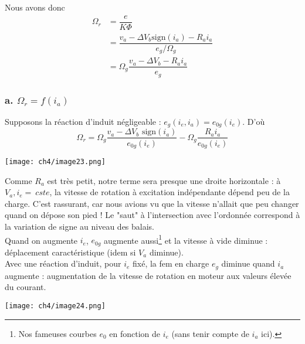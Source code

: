 	Nous avons donc
	\begin{equation}
	\begin{array}{ll}
	\Omega_r &= \dfrac{e}{K\Phi}\\
	&= \dfrac{v_a -\Delta V_b\text{sign}(i_a) - R_ai_a}{e_g/\Omega_g}\\
	&= \Omega_g\dfrac{v_a -\Delta V_b - R_ai_a}{e_g}	
	\end{array}
	\end{equation}
	
		\subsubsection{a. $\Omega_r = f(i_a)$}
		Supposons la réaction d'induit négligeable : $e_g(i_e,i_a) = e_{0g}(i_e)$. D'où
		\begin{equation}
		\Omega_r = \Omega_g \dfrac{v_a-\Delta V_b\text{ sign}(i_a)}{e_{0g}(i_e)}- 
		\Omega_g \dfrac{R_ai_a}{e_{0g}(i_e)}
		\end{equation}

\begin{center}
	\texttt{[image: ch4/image23.png]}
\end{center}
		Comme $R_a$ est très petit, notre terme sera presque une droite horizontale : à 
		$V_a, i_e=\ cste$, la vitesse de rotation à excitation indépendante dépend peu de 
		la charge. C'est rassurant, car nous avions vu que la vitesse n'allait que peu 
		changer quand on dépose son pied ! Le 	"saut" à l'intersection avec l'ordonnée 
		correspond à la variation de signe au niveau des balais. \\
		Quand on augmente $i_e$, $e_{0g}$ augmente aussi\footnote{Nos fameuses courbes $e_0$ 
		en fonction de $i_e$ (sans tenir compte de $i_a$ ici).} et la vitesse à vide diminue : 
		déplacement caractéristique (idem si $V_a$ diminue). \\
		
		Avec une réaction d'induit, pour $i_e$ fixé, la fem en charge $e_g$ diminue quand 
		$i_a$ augmente : augmentation de la vitesse de rotation en moteur aux valeurs 
		élevée du courant.
		\begin{center}
			\texttt{[image: ch4/image24.png]}
		\end{center}
	
